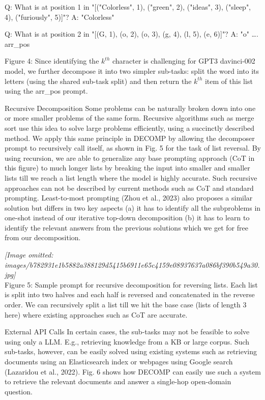\documentclass[
]{article}
\begin{document}
Q: What is at position 1 in "{[}("Colorless", 1), ("green", 2),
("ideas", 3), ("sleep", 4), ("furiously", 5){]}"? A: "Colorless"

Q: What is at position 2 in "{[}(G, 1), (o, 2), (o, 3), (g, 4), (l, 5),
(e, 6){]}"? A: "o" \ldots. arr\_pos

Figure 4: Since identifying the \(k^{th}\) character is challenging for
GPT3 davinci-002 model, we further decompose it into two simpler
sub-tasks: split the word into its letters (using the shared sub-task
split) and then return the \(k^{th}\) item of this list using the
arr\_pos prompt.

Recursive Decomposition Some problems can be naturally broken down into
one or more smaller problems of the same form. Recursive algorithms such
as merge sort use this idea to solve large problems efficiently, using a
succinctly described method. We apply this same principle in DECOMP by
allowing the decomposer prompt to recursively call itself, as shown in
Fig. 5 for the task of list reversal. By using recursion, we are able to
generalize any base prompting approach (CoT in this figure) to much
longer lists by breaking the input into smaller and smaller lists till
we reach a list length where the model is highly accurate. Such
recursive approaches can not be described by current methods such as CoT
and standard prompting. Least-to-most prompting (Zhou et al., 2023) also
proposes a similar solution but differs in two key aspects (a) it has to
identify all the subproblems in one-shot instead of our iterative
top-down decomposition (b) it has to learn to identify the relevant
answers from the previous solutions which we get for free from our
decomposition.

\textit{[Image omitted: images/b782931e1b5882a388129d5415b6911e65c4159e08937637a086bf390b549a30.jpg]}\\
Figure 5: Sample prompt for recursive decomposition for reversing lists.
Each list is split into two halves and each half is reversed and
concatenated in the reverse order. We can recursively split a list till
we hit the base case (lists of length 3 here) where existing approaches
such as CoT are accurate.

External API Calls In certain cases, the sub-tasks may not be feasible
to solve using only a LLM. E.g., retrieving knowledge from a KB or large
corpus. Such sub-tasks, however, can be easily solved using existing
systems such as retrieving documents using an Elasticsearch index or
webpages using Google search (Lazaridou et al., 2022). Fig. 6 shows how
DECOMP can easily use such a system to retrieve the relevant documents
and answer a single-hop open-domain question.
\end{document}
